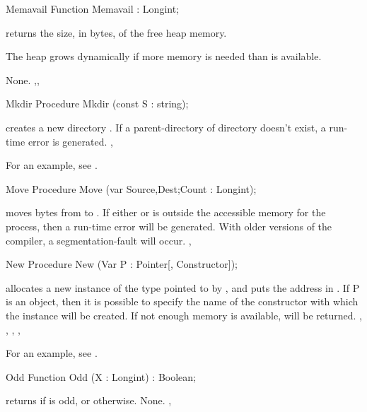 \documentclass{report}
\begin{document}

\begin{function}{Memavail}
\Declaration
Function Memavail  : Longint;

\Description
{} returns the size, in bytes, of the free heap memory.
\begin{remark}
The heap grows dynamically if more memory is needed than is available.
\end{remark}
\Errors
None.
\SeeAlso
{},, 
\end{function}


\begin{procedure}{Mkdir}
\Declaration
Procedure Mkdir (const S : string);

\Description
{} creates a new  directory .
\Errors
If a parent-directory of directory  doesn't exist, a run-time error is generated.
\SeeAlso
{}, 
\end{procedure}
For an example, see .
\begin{procedure}{Move}
\Declaration
Procedure Move (var Source,Dest;Count : Longint);

\Description
{} moves  bytes from  to .
\Errors
If either  or  is outside the accessible memory for
the process, then a run-time error will be generated. With older versions of
the compiler, a segmentation-fault will occur.
\SeeAlso
{}, 
\end{procedure}


\begin{procedure}{New}
\Declaration
Procedure New (Var P : Pointer[, Constructor]);

\Description
{} allocates a new instance of the type pointed to by , and
puts the address in .
If P is an object, then it is possible to
specify the name of the constructor with which the instance will be created.
\Errors
If not enough memory is available,  will be returned.
\SeeAlso
{}, , , ,
\end{procedure}
For an example, see .
\begin{function}{Odd}
\Declaration
Function Odd (X : Longint) : Boolean;

\Description
{} returns  if  is odd, or  otherwise.
\Errors
None.
\SeeAlso
{}, 
\end{function}
\end{document}
